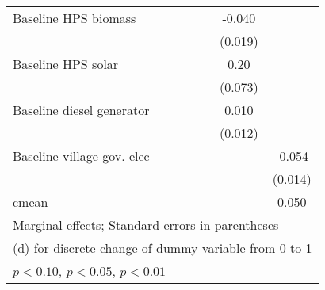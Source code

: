 \begin{table}[htbp]
\begin{tabular*}{1\hsize}{@{\hskip\tabcolsep\extracolsep\fill}l*{6}{c}}
Baseline HPS biomass&                  &                  &                  &                  &   -0.040\sym{**} &                  \\
                &                  &                  &                  &                  &  (0.019)         &                  \\
Baseline HPS solar&                  &                  &                  &                  &     0.20\sym{***}&                  \\
                &                  &                  &                  &                  &  (0.073)         &                  \\
Baseline diesel generator&                  &                  &                  &                  &    0.010         &                  \\
                &                  &                  &                  &                  &  (0.012)         &                  \\
Baseline village gov. elec&                  &                  &                  &                  &                  &   -0.054\sym{***}\\
                &                  &                  &                  &                  &                  &  (0.014)         \\
\midrule
cmean           &                  &                  &                  &                  &                  &    0.050         \\
\bottomrule
\multicolumn{7}{l}{\footnotesize Marginal effects; Standard errors in parentheses}\\
\multicolumn{7}{l}{\footnotesize  (d) for discrete change of dummy variable from 0 to 1}\\
\multicolumn{7}{l}{\footnotesize \sym{*} \(p<0.10\), \sym{**} \(p<0.05\), \sym{***} \(p<0.01\)}\\
\end{tabular*}
\end{table}
